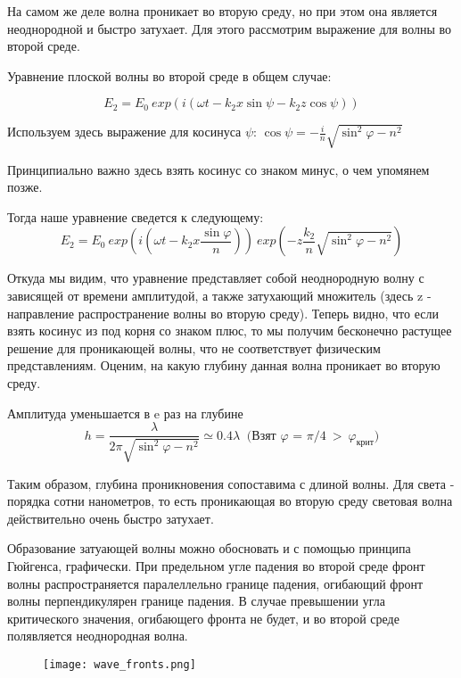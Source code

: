 	На самом же деле волна проникает во вторую среду, но при этом она является неоднородной и быстро затухает. Для этого рассмотрим выражение для волны во второй среде.
	
	Уравнение плоской волны во второй среде в общем случае:
	
	\[ E_{2} = E_{0} \ exp(i (\omega t - k_{2} x \sin{\psi} - k_{2} z \cos{\psi} )) \]
	
	Используем здесь выражение для косинуса $\psi$:
	$\cos{ \psi } = - \frac{i}{n} \sqrt{ \sin^{2}{\varphi}- n^{2} } $
	
	Принципиально важно здесь взять косинус со знаком минус, о чем упомянем позже.
	
	Тогда наше уравнение сведется к следующему: \[ E_{2} = E_{0} \ exp (  i (\omega t - k_{2} x \frac{ \sin{\varphi}}{n} )) \ exp ( - z  \frac{ k_{2} } {n} \sqrt{ \sin^{2}{\varphi}- n^{2} } ) \]
	
	Откуда мы видим, что уравнение представляет собой неоднородную волну с зависящей от времени амплитудой, а также затухающий множитель (здесь z - направление распространение волны во вторую среду). Теперь видно, что если взять косинус из под корня со знаком плюс, то мы получим бесконечно растущее решение для проникающей волны, что не соответствует физическим представлениям. Оценим, на какую глубину данная волна проникает во вторую среду.

	
	Амплитуда уменьшается в e раз на глубине	
	\[h = \frac{\lambda}{2 \pi \sqrt{\sin^{2}{\varphi}  - n^2} } \simeq 0.4 \lambda \ \text{ (Взят $\varphi$ = $\pi / 4 \ > \  \varphi_{\text{крит}} )$} \]
	
	Таким образом, глубина проникновения сопоставима с длиной волны. Для света - порядка сотни нанометров, то есть проникающая во вторую среду световая волна действительно очень быстро затухает.
	
	
	
	Образование затуающей волны можно обосновать и с помощью принципа Гюйгенса, графически. При предельном угле падения во второй среде фронт волны распространяется паралеллельно границе падения, огибающий фронт волны перпендикулярен границе падения. В случае превышении угла критического значения, огибающего фронта не будет, и во второй среде полявляется неоднородная волна.
	
	\begin{figure}[h]
		\centering
		\texttt{[image: wave\_fronts.png]}
	\end{figure}
	
